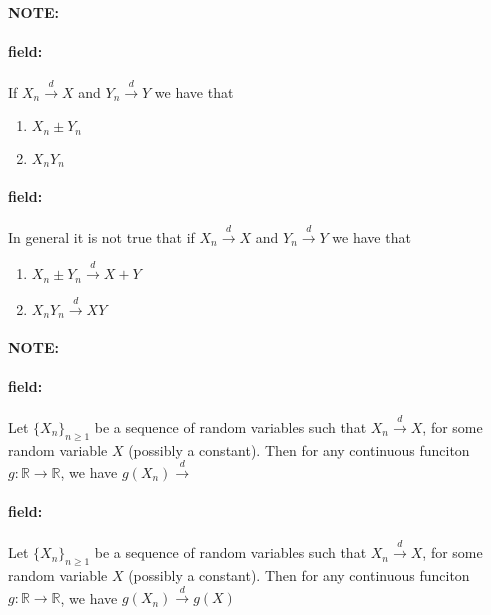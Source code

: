\documentclass[12pt]{article}
\newenvironment{note}{\paragraph{NOTE:}}{}
\newenvironment{field}{\paragraph{field:}}{}
\begin{document}
\begin{note}
  \begin{field}
    If $X_n \overset{d}{\to} X$ and $Y_n \overset{d}{\to} Y$ we have that
    \begin{enumerate}
      \item $X_n \pm Y_n $
      \item $X_nY_n $
    \end{enumerate}
  \end{field}
  \begin{field}
    In general it is not true that if $X_n \overset{d}{\to} X$ and $Y_n \overset{d}{\to} Y$ we have that
    \begin{enumerate}
      \item $X_n \pm Y_n \overset{d}{\to} X + Y$
      \item $X_nY_n \overset{d}{\to} XY$
    \end{enumerate}
  \end{field}
\end{note}

\begin{note}
  \begin{field}
    Let $\{X_n\}_{n \geq 1}$ be a sequence of random variables such that $X_n \overset{d}{\to}X$, for some random variable $X$ (possibly a constant). Then for any continuous funciton $g:\mathbb{R} \to \mathbb{R}$, we have $g(X_n) \overset{d}{\to} $
  \end{field}
  \begin{field}
    Let $\{X_n\}_{n \geq 1}$ be a sequence of random variables such that $X_n \overset{d}{\to}X$, for some random variable $X$ (possibly a constant). Then for any continuous funciton $g:\mathbb{R} \to \mathbb{R}$, we have $g(X_n) \overset{d}{\to} g(X)$
  \end{field}
\end{note}
\end{document}
